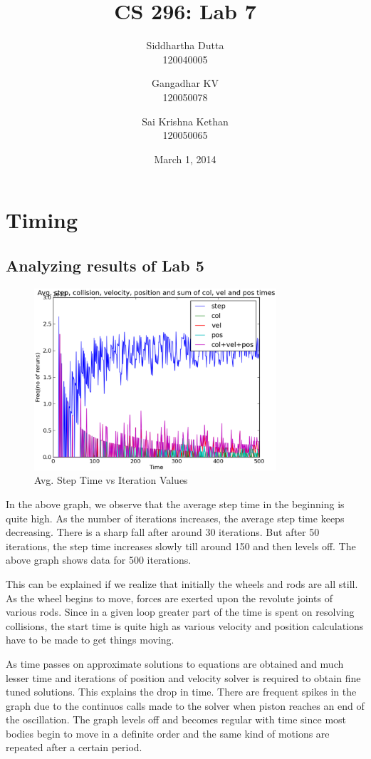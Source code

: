 \documentclass[11pt]{article}
\title{\textbf{CS 296: Lab 7}}
\author{Siddhartha Dutta \\ 120040005 \and Gangadhar KV \\ 120050078 \and Sai Krishna Kethan \\ 120050065}
\date{March 1, 2014}
\begin{document}
\maketitle

\section{Timing}
\subsection{Analyzing results of Lab 5}

\begin{figure}[ht!]
\centering
\includegraphics[width=90mm]{g32_plot02.eps}
\caption{Avg. Step Time vs Iteration Values}
\label{overflow}
\end{figure}

In the above graph, we observe that the average step time in the beginning is quite high. As the number of iterations increases, the average step time keeps decreasing. There is a sharp fall after around 30 iterations. But after 50 iterations, the step time increases slowly till around 150 and then levels off. The above graph shows data for 500 iterations. 

This can be explained if we realize that initially the wheels and rods are all still. As the wheel begins to move, forces are exerted upon the revolute joints of various rods. Since in a given loop greater part of the time is spent on resolving collisions, the start time is quite high as various velocity and position calculations have to be made to get things moving. 

As time passes on approximate solutions to equations are obtained and much lesser time and iterations of position and velocity solver is required to obtain fine tuned solutions. This explains the drop in time. There are frequent spikes in the graph due to the continuos calls made to the solver when piston reaches an end of the oscillation. The graph levels off and becomes regular with time since most bodies begin to move in a definite order and the same kind of motions are repeated after a certain period.
\end{document}

